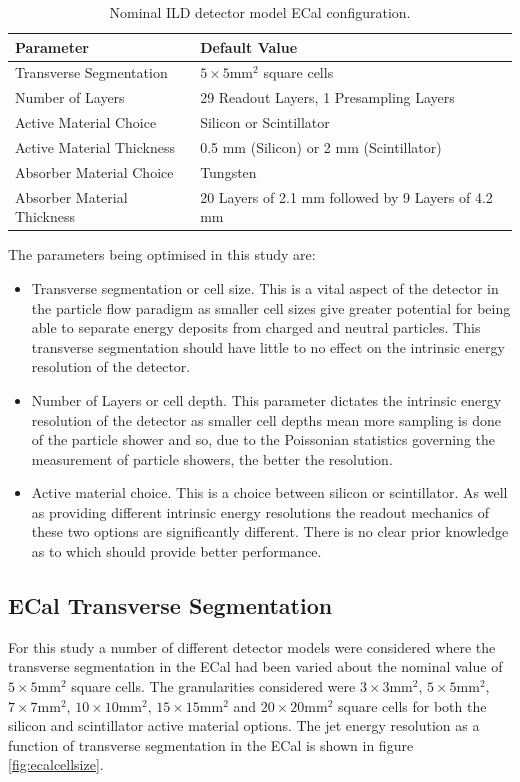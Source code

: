 \begin{table}[h!]
\centering
\begin{tabular}{ l l}
\hline
Parameter & Default Value \\
\hline
Transverse Segmentation & $5 \times 5 \text{mm}^{2}$ square cells \\
Number of Layers & 29 Readout Layers, 1 Presampling Layers \\
Active Material Choice & Silicon or Scintillator  \\
Active Material Thickness & 0.5 mm (Silicon) or 2 mm (Scintillator)  \\
Absorber Material Choice & Tungsten \\
Absorber Material Thickness & 20 Layers of 2.1 mm followed by 9 Layers of 4.2 mm \\
\hline
\end{tabular}
\caption[Nominal ILD detector model ECal configuration.]{Nominal ILD detector model ECal configuration.}
\label{table:defaultildecal}
\end{table}

The parameters being optimised in this study are:
\begin{itemize}
\item Transverse segmentation or cell size.  This is a vital aspect of the detector in the particle flow paradigm as smaller cell sizes give greater potential for being able to separate energy deposits from charged and neutral particles.  This transverse segmentation should have little to no effect on the intrinsic energy resolution of the detector.  
\item Number of Layers or cell depth.  This parameter dictates the intrinsic energy resolution of the detector as smaller cell depths mean more sampling is done of the particle shower and so, due to the Poissonian statistics governing the measurement of particle showers, the better the resolution.
\item Active material choice.  This is a choice between silicon or scintillator.  As well as providing different intrinsic energy resolutions the readout mechanics of these two options are significantly different.  There is no clear prior knowledge as to which should provide better performance. 
\end{itemize}


\subsection{ECal Transverse Segmentation}
\label{sec:ecalcells}
For this study a number of different detector models were considered where the transverse segmentation in the ECal had been varied about the nominal value of $5 \times 5 \text{mm}^{2}$ square cells.  The granularities considered were $3 \times 3 \text{mm}^{2}$, $5 \times 5 \text{mm}^{2}$, $7 \times 7 \text{mm}^{2}$, $10 \times 10 \text{mm}^{2}$, $15 \times 15 \text{mm}^{2}$ and $20 \times 20 \text{mm}^{2}$ square cells for both the silicon and scintillator active material options.  The jet energy resolution as a function of transverse segmentation in the ECal is shown in figure \ref{fig:ecalcellsize}.

